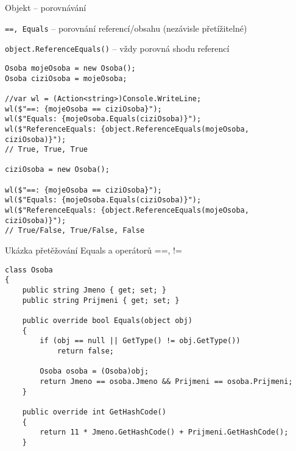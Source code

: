 \begin{frame}[fragile]
\vfill
\begin{bitemize}{Objekt -- porovnávání}
\item \lstinline|==, Equals| -- porovnání referencí/obsahu (nezávisle přetížitelné)
\item \lstinline|object.ReferenceEquals()| -- vždy porovná shodu referencí
\end{bitemize}
\vfill
\begin{yesblock}
\begin{lstlisting}[basicstyle=\small]
Osoba mojeOsoba = new Osoba();
Osoba ciziOsoba = mojeOsoba;

//var wl = (Action<string>)Console.WriteLine;
wl($"==: {mojeOsoba == ciziOsoba}");
wl($"Equals: {mojeOsoba.Equals(ciziOsoba)}");
wl($"ReferenceEquals: {object.ReferenceEquals(mojeOsoba, ciziOsoba)}");
// True, True, True

ciziOsoba = new Osoba();

wl($"==: {mojeOsoba == ciziOsoba}");
wl($"Equals: {mojeOsoba.Equals(ciziOsoba)}");
wl($"ReferenceEquals: {object.ReferenceEquals(mojeOsoba, ciziOsoba)}");
// True/False, True/False, False
\end{lstlisting}
\end{yesblock}
\vfill
\end{frame}




\begin{frame}[fragile]
\begin{bonusblock}{Ukázka přetěžování Equals a operátorů ==, !=}
\begin{lstlisting}[basicstyle=\small]
class Osoba
{
	public string Jmeno { get; set; }
	public string Prijmeni { get; set; }
	
	public override bool Equals(object obj)
	{
	    if (obj == null || GetType() != obj.GetType())
	        return false;
	
	    Osoba osoba = (Osoba)obj;
	    return Jmeno == osoba.Jmeno && Prijmeni == osoba.Prijmeni;
	}
	
	public override int GetHashCode()
	{
		return 11 * Jmeno.GetHashCode() + Prijmeni.GetHashCode();
	}
\end{lstlisting}
\end{bonusblock}
\end{frame}


